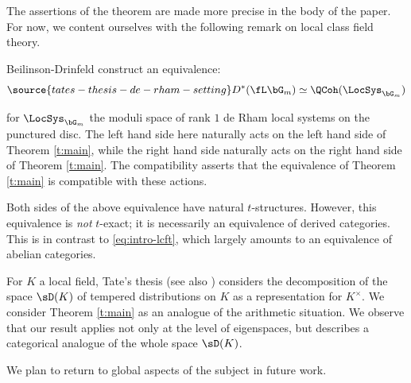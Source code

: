 \begin{rem}
\notready

The assertions of the theorem are made more precise in the body of the paper.
For now, we content ourselves with the following remark on local class field theory.

Beilinson-Drinfeld construct an equivalence:
%
\begin{equation}\label{eq:intro-lcft}
\source{tates-thesis-de-rham-setting}
D^*(\fL\bG_m) \simeq \QCoh(\LocSys_{\bG_m})
\end{equation}

 for $\LocSys_{\bG_m}$ the moduli space of rank $1$ de Rham local systems on the
punctured disc. The left hand side here naturally acts on
the left hand side of Theorem \ref{t:main}, while the right hand side
naturally acts on the right hand side of Theorem \ref{t:main}. The compatibility
asserts that the equivalence of Theorem \ref{t:main} is compatible with
these actions.

\end{rem}

\begin{rem}
\notready

Both sides of the above equivalence have natural $t$-structures.
However, this equivalence is \emph{not} $t$-exact; it is necessarily
an equivalence of derived categories. This is in contrast to \eqref{eq:intro-lcft},
which largely amounts to an equivalence of abelian categories.

\end{rem}

\begin{rem}
\notready

For $K$ a local field, Tate's thesis \cite{tate-thesis}
(see also \cite{tate-thesis-weil})
considers the decomposition of the space
$\sD(K)$ of tempered distributions on $K$
as a representation for $K^{\times}$. We consider Theorem \ref{t:main}
as an analogue of the arithmetic situation. We observe that
our result applies not only at the level of eigenspaces,
but describes a categorical analogue of the whole space $\sD(K)$.

We plan to return to global aspects of the subject in future work.


\end{rem}

